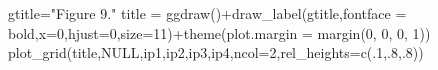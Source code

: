 \documentclass[
  letterpaper,
  DIV=11,
  numbers=noendperiod]{scrartcl}
\newenvironment{Shaded}{\begin{snugshade}}{\end{snugshade}}
\newcommand{\AttributeTok}[1]{\textcolor[rgb]{0.40,0.45,0.13}{#1}}
\newcommand{\ConstantTok}[1]{\textcolor[rgb]{0.56,0.35,0.01}{#1}}
\newcommand{\DecValTok}[1]{\textcolor[rgb]{0.68,0.00,0.00}{#1}}
\newcommand{\FunctionTok}[1]{\textcolor[rgb]{0.28,0.35,0.67}{#1}}
\newcommand{\NormalTok}[1]{\textcolor[rgb]{0.00,0.23,0.31}{#1}}
\newcommand{\OtherTok}[1]{\textcolor[rgb]{0.00,0.23,0.31}{#1}}
\newcommand{\SpecialCharTok}[1]{\textcolor[rgb]{0.37,0.37,0.37}{#1}}
\newcommand{\StringTok}[1]{\textcolor[rgb]{0.13,0.47,0.30}{#1}}
\begin{document}
\begin{Shaded}
\begin{Highlighting}[]
\NormalTok{gtitle}\OtherTok{=}\StringTok{"Figure 9."}
\NormalTok{title }\OtherTok{=} \FunctionTok{ggdraw}\NormalTok{()}\SpecialCharTok{+}\FunctionTok{draw\_label}\NormalTok{(gtitle,}\AttributeTok{fontface =} \StringTok{\textquotesingle{}bold\textquotesingle{}}\NormalTok{,}\AttributeTok{x=}\DecValTok{0}\NormalTok{,}\AttributeTok{hjust=}\DecValTok{0}\NormalTok{,}\AttributeTok{size=}\DecValTok{11}\NormalTok{)}\SpecialCharTok{+}\FunctionTok{theme}\NormalTok{(}\AttributeTok{plot.margin =} \FunctionTok{margin}\NormalTok{(}\DecValTok{0}\NormalTok{, }\DecValTok{0}\NormalTok{, }\DecValTok{0}\NormalTok{, }\DecValTok{1}\NormalTok{))}
\FunctionTok{plot\_grid}\NormalTok{(title,}\ConstantTok{NULL}\NormalTok{,ip1,ip2,ip3,ip4,}\AttributeTok{ncol=}\DecValTok{2}\NormalTok{,}\AttributeTok{rel\_heights=}\FunctionTok{c}\NormalTok{(.}\DecValTok{1}\NormalTok{,.}\DecValTok{8}\NormalTok{,.}\DecValTok{8}\NormalTok{))}
\end{Highlighting}
\end{Shaded}
\end{document}
